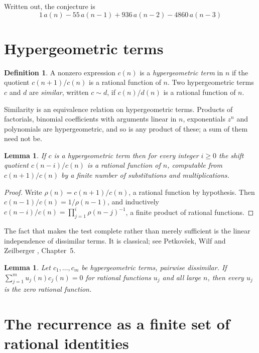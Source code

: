 \documentclass[11pt,a4paper]{article}
\theoremstyle{plain}
\newtheorem{lemma}[theorem]{Lemma}
\theoremstyle{definition}
\newtheorem{definition}[theorem]{Definition}
\begin{document}
Written out, the conjecture is
\begin{equation}\label{eq:conj}
1\,a(n) - 55\,a(n-1) + 936\,a(n-2) - 4860\,a(n-3)
\end{equation}

\section{Hypergeometric terms}

\begin{definition}
A nonzero expression $c(n)$ is a \emph{hypergeometric term} in $n$ if the quotient
$c(n+1)/c(n)$ is a rational function of $n$. Two hypergeometric terms $c$ and $d$ are
\emph{similar}, written $c\sim d$, if $c(n)/d(n)$ is a rational function of $n$.
\end{definition}

Similarity is an equivalence relation on hypergeometric terms. Products of factorials,
binomial coefficients with arguments linear in $n$, exponentials $z^{n}$ and polynomials
are hypergeometric, and so is any product of these; a sum of them need not be.

\begin{lemma}\label{lem:shift}
If $c$ is a hypergeometric term then for every integer $i\ge 0$ the shift quotient
$c(n-i)/c(n)$ is a rational function of $n$, computable from $c(n+1)/c(n)$ by a finite
number of substitutions and multiplications.
\end{lemma}

\begin{proof}
Write $\rho(n)=c(n+1)/c(n)$, a rational function by hypothesis. Then
$c(n-1)/c(n)=1/\rho(n-1)$, and inductively
$c(n-i)/c(n)=\prod_{j=1}^{i}\rho(n-j)^{-1}$, a finite product of rational functions.
\end{proof}

The fact that makes the test complete rather than merely sufficient is the linear
independence of dissimilar terms. It is classical; see Petkov\v{s}ek, Wilf and Zeilberger
\cite{AB}, Chapter~5.

\begin{lemma}\label{lem:indep}
Let $c_{1},\dots,c_{m}$ be hypergeometric terms, pairwise dissimilar. If
$\sum_{j=1}^{m}u_{j}(n)c_{j}(n)=0$ for rational functions $u_{j}$ and all large $n$, then
every $u_{j}$ is the zero rational function.
\end{lemma}

\section{The recurrence as a finite set of rational identities}
\end{document}
